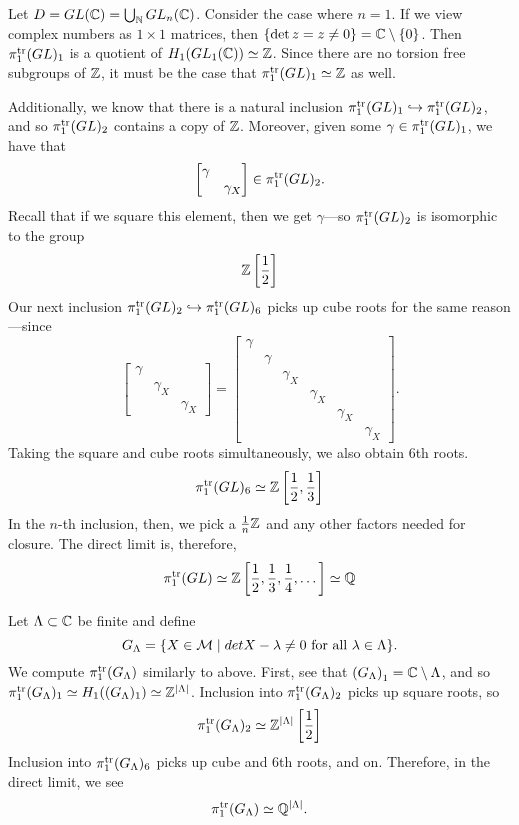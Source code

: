 \begin{example}
  Let \(D = GL(\mathbb{C}) = \bigcup_{\mathbb{N}} GL_n(\mathbb{C})\). Consider the case where \(n =1\).
  If we view complex numbers as \(1\times 1\) matrices, then
  \(\{\det z = z \neq 0\} = \mathbb{C} \setminus \{0\} \). Then
  \(\pi_1^{\operatorname{tr}}(GL)_1\) is a quotient of \(H_1(GL_1(\mathbb{C}))\simeq \mathbb{Z} \).
  Since there are no torsion free subgroups of \(\mathbb{Z} \), it must be the case
  that \(\pi_1^{\operatorname{tr}}(GL)_1\simeq\mathbb{Z} \) as well.

  Additionally, we know that there is a natural inclusion
  \(\pi_1^{\operatorname{tr}}(GL)_1 \hookrightarrow \pi_1^{\operatorname{tr}}(GL)_2\), and so
  \(\pi_1^{\operatorname{tr}}(GL)_2\) contains a copy of \(\mathbb{Z} \). Moreover, given some
  \(\gamma \in \pi_1^{\operatorname{tr}}(GL)_1\), we have that
  \[
    \begin{bmatrix} \gamma&\\&\gamma_X \end{bmatrix} \in \pi_1^{\operatorname{tr}}(GL)_2.
  \]
  Recall that if we square this element, then we get \(\gamma\)---so
  \(\pi_1^{\operatorname{tr}}(GL)_2\) is isomorphic to the group
  \[
    \mathbb{Z} \left[\frac{1}{2}\right]
  \]
  Our next inclusion
  \(\pi_1^{\operatorname{tr}}(GL)_2\hookrightarrow \pi_1^{\operatorname{tr}}(GL)_6\) picks up cube roots for
  the same reason---since
  \[
    \begin{bmatrix} \gamma\\&\gamma_X\\&& \gamma_X  \end{bmatrix} =
    \begin{bmatrix} \gamma\\&\gamma\\&&\gamma_X\\&&&\gamma_X\\&&&&\gamma_X\\&&&&&\gamma_X  \end{bmatrix}.
  \]
  Taking the square and cube roots simultaneously, we also obtain 6th roots.
  \[
    \pi_1^{\operatorname{tr}}(GL)_6 \simeq \mathbb{Z} \left[\frac{1}{2}, \frac{1}{3}\right]
  \]
  In the \(n\)-th inclusion, then, we pick a \(\frac{1}{n}\mathbb{Z} \) and any other
  factors needed for closure.
  The direct limit is, therefore,
  \[
    \pi_1^{\operatorname{tr}}(GL) \simeq \mathbb{Z} \left[\frac{1}{2},\frac{1}{3},\frac{1}{4}, \dots\right]\simeq \mathbb{Q}
  \]
\end{example}

\begin{example}
  Let \(\Lambda \subset \mathbb{C} \) be finite and define
  \[
    G_\Lambda = \{ X \in \mathcal{M} \mid det X - \lambda \neq 0 \textrm{ for all
    } \lambda \in \Lambda\}.
  \]
  We compute \(\pi_1^{\operatorname{tr}}(G_\Lambda)\) similarly to above. First, see that
  \( \left( G_\Lambda \right) _1 = \mathbb{C} \setminus \Lambda\), and so
  \(\pi_1^{\operatorname{tr}}(G_\Lambda)_1\simeq H_1((G_\Lambda)_1)\simeq \mathbb{Z}^{|\Lambda|}\).
  Inclusion into \(\pi_1^{\operatorname{tr}}(G_\Lambda)_2\) picks up square roots, so
  \[
    \pi_1^{\operatorname{tr}}(G_\Lambda)_2 \simeq \mathbb{Z}^{|\Lambda|}\left[ \frac{1}{2} \right]
  \]
  Inclusion into \(\pi_1^{\operatorname{tr}}(G_\Lambda)_6\) picks up cube and 6th roots, and
  on. Therefore, in the direct limit, we see
  \[
    \pi_1^{\operatorname{tr}}(G_\Lambda) \simeq \mathbb{Q} ^{|\Lambda|}.
  \]
\end{example}
